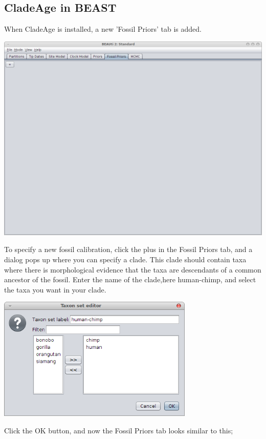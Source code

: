 \documentclass{article}
\begin{document}
\subsection{CladeAge in BEAST}
When CladeAge is installed, a new 'Fossil Priors' tab is added.
\begin{center}\includegraphics[width=\textwidth,clip=true,trim=0 300 0 0]{fossilPriorsTab.png}\end{center}
To specify a new fossil calibration, click the plus in the Fossil Priors tab, 
and a dialog pops up where you can specify a clade. This clade should contain
taxa where there is morphological evidence that the taxa are descendants of
a common ancestor of the fossil. Enter the name of the clade,here 
human-chimp, and select the taxa you want in your clade.
\begin{center}\includegraphics[width=0.7\textwidth]{taxonSetDialog.png}\end{center}
Click the OK button, and now the Fossil Priors tab looks similar to this;
\end{document}
